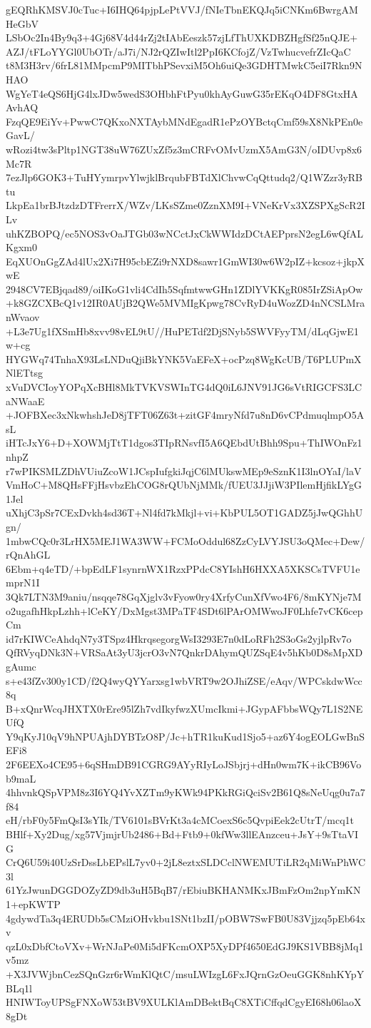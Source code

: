 gEQRhKMSVJ0cTuc+I6IHQ64pjpLePtVVJ/fNIeTbnEKQJq5iCNKm6BwrgAMHeGbV
LSbOc2In4By9q3+4Gj68V4d44rZj2tIAbEeszk57zjLfThUXKDBZHgfSf25nQJE+
AZJ/tFLoYYGl0UbOTr/aJ7i/NJ2rQZIwItl2PpI6KCfojZ/VzTwhucvefrZIcQaC
t8M3H3rv/6frL81MMpcmP9MITbhPSevxiM5Oh6uiQe3GDHTMwkC5eiI7Rkn9NHAO
WgYeT4eQS6HjG4lxJDw5wedS3OHbhFtPyu0khAyGuwG35rEKqO4DF8GtxHAAvhAQ
FzqQE9EiYv+PwwC7QKxoNXTAybMNdEgadR1ePzOYBctqCmf59sX8NkPEn0eGavL/
wRozi4tw3sPltp1NGT38uW76ZUxZf5z3mCRFvOMvUzmX5AmG3N/oIDUvp8x6Mc7R
7ezJlp6GOK3+TuHYymrpvYlwjklBrqubFBTdXlChvwCqQttudq2/Q1WZzr3yRBtu
LkpEa1brBJtzdzDTFrerrX/WZv/LKsSZme0ZznXM9I+VNeKrVx3XZSPXgScR2ILv
uhKZBOPQ/ec5NOS3vOaJTGb03wNCctJxCkWWIdzDCtAEPprsN2egL6wQfALKgxm0
EqXUOnGgZAd4lUx2Xi7H95cbEZi9rNXD8sawr1GmWI30w6W2pIZ+kcsoz+jkpXwE
2948CV7EBjqad89/oiIKoG1vli4CdIh5SqfmtwwGHn1ZDlYVKKgR085IrZSiApOw
+k8GZCXBcQ1v12IR0AUjB2QWe5MVMIgKpwg78CvRyD4uWozZD4nNCSLMranWvaov
+L3e7Ug1fXSmHb8xvv98vEL9tU//HuPETdf2DjSNyb5SWVFyyTM/dLqGjwE1w+cg
HYGWq74TnhaX93LsLNDuQjiBkYNK5VaEFeX+ocPzq8WgKcUB/T6PLUPmXNlETtsg
xVuDVCIoyYOPqXcBHl8MkTVKVSWInTG4dQ0iL6JNV91JG6sVtRIGCFS3LCaNWaaE
+JOFBXec3xNkwhshJeD8jTFT06Z63t+zitGF4mryNfd7u8nD6vCPdmuqlmpO5AsL
iHTcJxY6+D+XOWMjTtT1dgos3TIpRNsvfI5A6QEbdUtBhh9Spu+ThIWOnFz1nhpZ
r7wPIKSMLZDhVUiuZcoW1JCspIufgkiJqjC6lMUkswMEp9eSznK1I3lnOYaI/laV
VmHoC+M8QHsFFjHsvbzEhCOG8rQUbNjMMk/fUEU3JJjiW3PIlemHjfikLYgG1Jel
uXhjC3pSr7CExDvkh4sd36T+Nl4fd7kMkjl+vi+KbPUL5OT1GADZ5jJwQGhhUgn/
1mbwCQc0r3LrHX5MEJ1WA3WW+FCMoOddul68ZzCyLVYJSU3oQMec+Dew/rQnAhGL
6Ebm+q4eTD/+bpEdLF1synrnWX1RzxPPdcC8YIshH6HXXA5XKSCsTVFU1emprN1I
3Qk7LTN3M9aniu/nsqqe78GqXjglv3vFyow0ry4XrfyCunXfVwo4F6/8mKYNje7M
o2ugafhHkpLzhh+lCeKY/DxMgst3MPaTF4SDt6lPArOMWwoJF0Lhfe7vCK6cepCm
id7rKIWCeAhdqN7y3TSpz4HkrqsegorgWsI3293E7n0dLoRFh2S3oGs2yjlpRv7o
QfRVyqDNk3N+VRSaAt3yU3jcrO3vN7QnkrDAhymQUZSqE4v5hKb0D8sMpXDgAumc
s+e43fZv300y1CD/f2Q4wyQYYarxsg1wbVRT9w2OJhiZSE/eAqv/WPCskdwWcc8q
B+xQnrWcqJHXTX0rEre95lZh7vdIkyfwzXUmcIkmi+JGypAFbbsWQy7L1S2NEUfQ
Y9qKyJ10qV9hNPUAjhDYBTzO8P/Jc+hTR1kuKud1Sjo5+az6Y4ogEOLGwBnSEFi8
2F6EEXo4CE95+6qSHmDB91CGRG9AYyRIyLoJSbjrj+dHn0wm7K+ikCB96Vob9maL
4hhvnkQSpVPM8z3I6YQ4YvXZTm9yKWk94PKkRGiQciSv2B61Q8sNeUqg0u7a7f84
eH/rbF0y5FmQsI3sYIk/TV6101sBVrKt3a4cMCoexS6c5QvpiEek2cUtrT/mcq1t
BHlf+Xy2Dug/xg57VjmjrUb2486+Bd+Ftb9+0kfWw3llEAnzceu+JsY+9sTtaVIG
CrQ6U59i40UzSrDssLbEPslL7yv0+2jL8eztxSLDCclNWEMUTiLR2qMiWnPhWC3l
61YzJwunDGGDOZyZD9db3uH5BqB7/rEbiuBKHANMKxJBmFzOm2npYmKN1+epKWTP
4gdywdTa3q4ERUDb5sCMziOHvkbu1SNt1bzII/pOBW7SwFB0U83Vjjzq5pEb64xv
qzL0xDbfCtoVXv+WrNJaPe0Mi5dFKcmOXP5XyDPf4650EdGJ9KS1VBB8jMq1v5mz
+X3JVWjbnCezSQnGzr6rWmKlQtC/msuLWIzgL6FxJQrnGzOeuGGK8nhKYpYBLq1l
HNIWToyUPSgFNXoW53tBV9XULKlAmDBektBqC8XTiCffqdCgyEI68h06laoX8gDt

